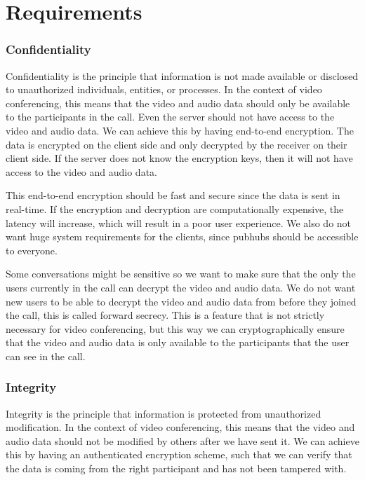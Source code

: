 \documentclass{report}
\begin{document}
\chapter{Requirements}

\subsection{Confidentiality}
Confidentiality is the principle that information is not made available or disclosed to unauthorized individuals,
entities, or processes. In the context of video conferencing, this means that the video and audio data should only
be available to the participants in the call. Even the server should not have access to the video and audio data. We
can achieve this by having end-to-end encryption. The data is encrypted on the client side and only decrypted by
the receiver on their client side. If the server does not know the encryption keys, then it will not have access to
the video and audio data.

This end-to-end encryption should be fast and secure since the data is sent in real-time. If the encryption and
decryption are computationally expensive, the latency will increase, which will result in a poor user experience. We
also do not want huge system requirements for the clients, since pubhubs should be accessible to everyone.

Some conversations might be sensitive so we want to make sure that the only the users currently in the call can
decrypt the video and audio data. We do not want new users to be able to decrypt the video and audio data from
before they joined the call, this is called forward secrecy. This is a feature that is not strictly necessary for
video conferencing, but this way we can cryptographically ensure that the video and audio data is only available to
the participants that the user can see in the call.

\subsection{Integrity}
Integrity is the principle that information is protected from unauthorized modification. In the context of video
conferencing, this means that the video and audio data should not be modified by others after we have sent it. We can
achieve this by having an authenticated encryption scheme, such that we can verify that the data is coming from the
right participant and has not been tampered with.
\end{document}
